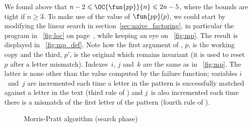 \vspace*{-20pt}


We found above that \(n-2 \leqslant \OC{\fun{pp}}{n} \leqslant 2n -
5\), where the bounds are tight if \(n \geqslant 3\). To make use of
the value of \(\fun{pp}(p)\), we could start by modifying the linear
search in section~\ref{sec:naive_factoring}, in particular the program
in \fig~\ref{fig:loc} on page~\pageref{fig:loc}, while keeping an eye
on \fig~\vref{fig:mp}. The result is displayed in
\fig~\vref{fig:mp_def}. Note how the first argument of
, \(p\), is the working copy and the
third, \(p'\), is the original which remains invariant (it is used to
reset~\(p\) after a letter mismatch). Indexes~\(i\), \(j\) and~\(k\)
are the same as in \fig~\vref{fig:mp}. The latter is none other than
the value computed by the failure function; variables \(i\)~and~\(j\)
are incremented each time a letter in the pattern is successfully
matched against a letter in the text (third rule of ) and
\(j\)~is also incremented each time there is a mismatch of the first
letter of the pattern (fourth rule of ).
\begin{figure}[h]
\centering
\abovedisplayskip=0pt
\belowdisplayskip=0pt
\caption{Morris-Pratt algorithm (search phase)}
\label{fig:mp_def}
\end{figure}


